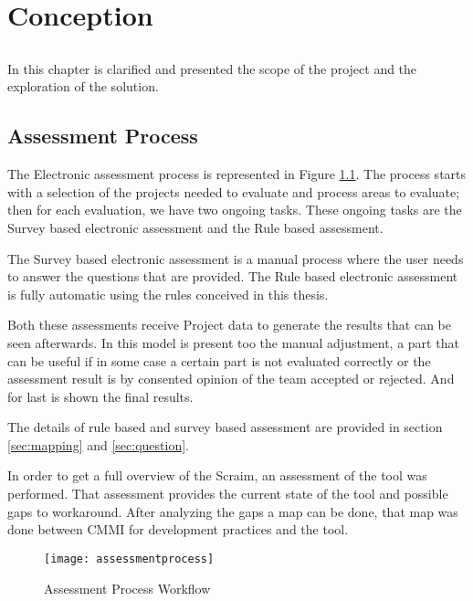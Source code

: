 \chapter{Conception} \label{chap:conception}

\section*{}

In this chapter is clarified and presented the scope of the project and the exploration of the solution.

\section{Assessment Process} \label{sec:Approach}

The Electronic assessment process is represented in Figure \ref{fig:assessmentprocess}.
The process starts with a selection of the projects needed to evaluate and process areas to evaluate; then for each evaluation, we have two ongoing tasks. These ongoing tasks are the Survey based electronic assessment and the Rule based assessment.

The Survey based electronic assessment is a manual process where the user needs to answer the questions that are provided. The Rule based electronic assessment is fully automatic using the rules conceived in this thesis.

Both these assessments receive Project data to generate the results that can be seen afterwards. In this model is present too the manual adjustment, a part that can be useful if in some case a certain part is not evaluated correctly or the assessment result is by consented opinion of the team accepted or rejected. And for last is shown the final results. 

The details of rule based and survey based assessment are provided in section \ref{sec:mapping} and \ref{sec:question}.

In order to get a full overview of the Scraim, an assessment of the tool was performed. That assessment provides the current state of the tool and possible gaps to workaround.
After analyzing the gaps a map can be done, that map was done between CMMI for development practices and the tool.

\begin{landscape}
	\begin{figure}[h]
		\begin{center}
			\leavevmode
			\texttt{[image: assessmentprocess]}
			\caption{Assessment Process Workflow}
			\label{fig:assessmentprocess}
		\end{center}
	\end{figure}
\end{landscape}

